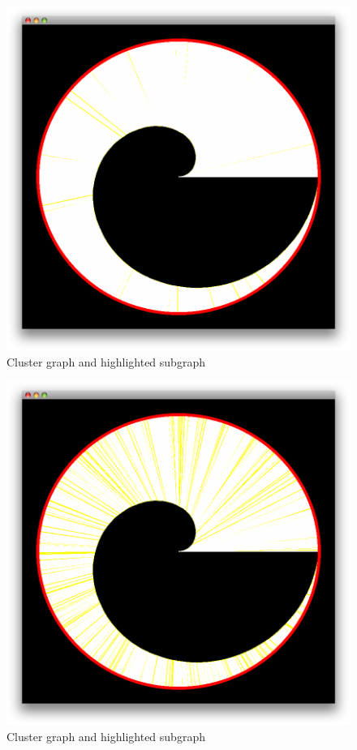 \documentclass[a4paper,oneside]{article}
\begin{document}
\begin{figure}
\begin{center}
	\includegraphics[scale=0.3]{cluster_jogl_impl_with_subgraph_1.png}
	\caption{Cluster graph and highlighted subgraph}
	\label{cluster_jogl_impl_with_subgraph_1}
\end{center}
\end{figure}

\begin{figure}
\begin{center}
	\includegraphics[scale=0.3]{cluster_jogl_impl_with_subgraph_2.png}
	\caption{Cluster graph and highlighted subgraph}
	\label{cluster_jogl_impl_with_subgraph_2}
\end{center}
\end{figure}
\end{document}
